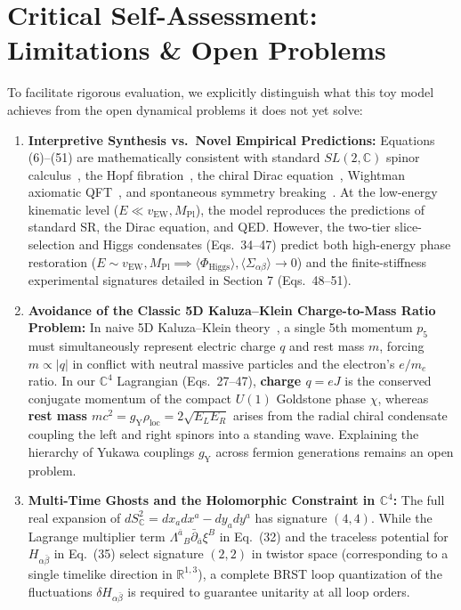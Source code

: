 \documentclass[11pt,a4paper]{article}
\begin{document}
\section{Critical Self-Assessment: Limitations \& Open Problems}

To facilitate rigorous evaluation, we explicitly distinguish what this toy model achieves from the open dynamical problems it does not yet solve:
\begin{enumerate}
    \item \textbf{Interpretive Synthesis vs.\ Novel Empirical Predictions:}
    Equations (6)--(51) are mathematically consistent with standard $SL(2,\mathbb{C})$ spinor calculus~\cite{PenroseRindler1984}, the Hopf fibration~\cite{Hopf1931}, the chiral Dirac equation~\cite{Dirac1928,PenroseRoad2004}, Wightman axiomatic QFT~\cite{StreaterWightman1964}, and spontaneous symmetry breaking~\cite{Higgs1964,NJL1961}. At the low-energy kinematic level ($E \ll v_{\text{EW}}, M_{\text{Pl}}$), the model reproduces the predictions of standard SR, the Dirac equation, and QED. However, the two-tier slice-selection and Higgs condensates (Eqs.\ 34--47) predict both high-energy phase restoration ($E \sim v_{\text{EW}}, M_{\text{Pl}} \implies \langle \Phi_{\text{Higgs}}\rangle, \langle \Sigma_{\alpha\beta}\rangle \to 0$) and the finite-stiffness experimental signatures detailed in Section 7 (Eqs.\ 48--51).
    \item \textbf{Avoidance of the Classic 5D Kaluza--Klein Charge-to-Mass Ratio Problem:}
    In naive 5D Kaluza--Klein theory~\cite{Kaluza1921,Klein1926}, a single 5th momentum $p_5$ must simultaneously represent electric charge $q$ and rest mass $m$, forcing $m \propto |q|$ in conflict with neutral massive particles and the electron's $e/m_e$ ratio. In our $\mathbb{C}^4$ Lagrangian (Eqs.\ 27--47), \textbf{charge $q = eJ$} is the conserved conjugate momentum of the compact $U(1)$ Goldstone phase $\chi$, whereas \textbf{rest mass $mc^2 = g_{\text{Y}}\rho_{\text{loc}} = 2\sqrt{E_L E_R}$} arises from the radial chiral condensate coupling the left and right spinors into a standing wave. Explaining the hierarchy of Yukawa couplings $g_{\text{Y}}$ across fermion generations remains an open problem.
    \item \textbf{Multi-Time Ghosts and the Holomorphic Constraint in $\mathbb{C}^4$:}
    The full real expansion of $dS_{\mathbb{C}}^2 = dx_a dx^a - dy_a dy^a$ has signature $(4,4)$. While the Lagrange multiplier term $\Lambda^{\bar{a}}{}_B \bar{\partial}_{\bar{a}}\xi^B$ in Eq.\ (32) and the traceless potential for $H_{\alpha\bar{\beta}}$ in Eq.\ (35) select signature $(2,2)$ in twistor space (corresponding to a single timelike direction in $\mathbb{R}^{1,3}$), a complete BRST loop quantization of the fluctuations $\delta H_{\alpha\bar{\beta}}$ is required to guarantee unitarity at all loop orders.

\end{enumerate}
\end{document}
